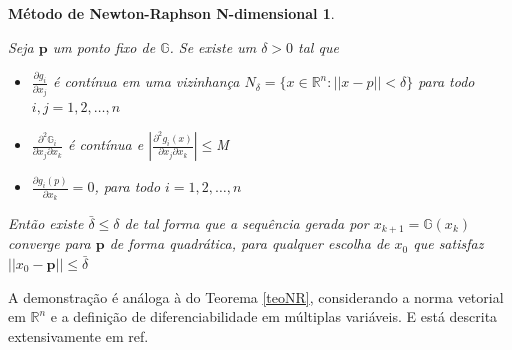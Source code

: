 \newtheorem*{dfNRnd}{Método de Newton-Raphson N-dimensional}
\begin{dfNRnd}
    \begin{prop}
    Seja $\mathbf{p}$ um ponto fixo de \(\mathbb{G}\). Se existe um \(\delta > 0\) tal que

    \begin{itemize}\label{teoMPF}
        \item[i)] $\frac{\partial g_i}{\partial x_j}$ é contínua em uma vizinhança $N_{\delta} = \{x \in \mathbb{R}^n : ||x - p|| < \delta\}$ para todo $i, j = 1, 2, \ldots, n$
        \item [ii)] $\frac{\partial^2 \mathbb{G}_i}{\partial x_j \partial x_k}$ é contínua e $|\frac{\partial^2g_i(x)}{\partial x_j \partial x_k}| \leq $M$ $
        \item [iii)] $\frac{\partial g_i(p)}{\partial x_k} = 0$, para todo $i = 1,2, \ldots, n$
    \end{itemize}
    Então existe \(\bar{\delta} \leq \delta\) de tal forma que a sequência gerada por $x_{k+1} = \mathbb{G}(x_{k})$ converge para $\mathbf{p}$ de forma quadrática, para qualquer escolha de $x_{0}$ que satisfaz \(|| x_{0} - \mathbf{p} || \leq \bar{\delta}\)
    \end{prop}

\end{dfNRnd}

A demonstração é análoga à do Teorema \ref{teoNR}, considerando a norma vetorial em \(\mathbb{R}^n\) e a definição de diferenciabilidade em múltiplas variáveis. E está descrita extensivamente em ref.

